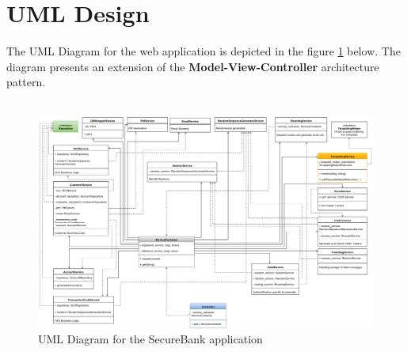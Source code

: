 \section{UML Design} \label{section_classes}

The UML Diagram for the web application is depicted in the figure \ref{fig:webapp_class_diagram} below.
The diagram presents an extension of the \textbf{Model-View-Controller} architecture pattern. \\ \\

\begin{figure}[ht]
	\centering
	\includegraphics[width=0.9\linewidth]{figures/webapp_class_diagram.png}
	\caption{UML Diagram for the SecureBank application}
	\label{fig:webapp_class_diagram}
\end{figure}

\clearpage

